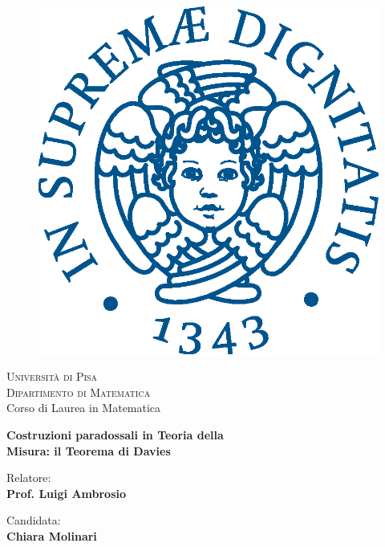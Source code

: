 \begin{titlepage}
\begin{figure}[!htb]
    \centering
    \includegraphics[keepaspectratio=true,scale=0.5]{cherubino_pant541.eps}
\end{figure}

\begin{center}
    \LARGE{\textsc{Università di Pisa}}
    \vspace{5mm}
    \\ \large{\textsc{Dipartimento di Matematica}}
    \vspace{5mm}
    \\ \LARGE{Corso di Laurea in Matematica}
\end{center}

\vspace{15mm}
\begin{center}
    {\LARGE{\bf Costruzioni paradossali in Teoria della\\\vspace{5mm}Misura: il Teorema di Davies}}
\end{center}
\vspace{30mm}

\begin{minipage}[t]{0.47\textwidth}
	{\large{Relatore:}{\normalsize\vspace{3mm}
	\bf\\ \large{Prof. Luigi Ambrosio}}}
\end{minipage}
\hfill
\begin{minipage}[t]{0.47\textwidth}\raggedleft
	{\large{Candidata:}{\normalsize\vspace{3mm} \bf\\ \large{Chiara Molinari\\ }}}
\end{minipage}

\vspace{30mm}
\hrulefill
\\

\end{titlepage}